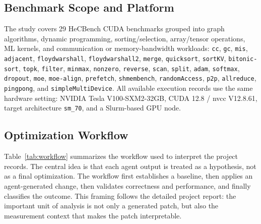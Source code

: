 \documentclass[conference]{IEEEtran}
\begin{document}
\subsection{Benchmark Scope and Platform}

The study covers 29 HeCBench CUDA benchmarks grouped into graph algorithms, dynamic programming, sorting/selection, array/tensor operations, ML kernels, and communication or memory-bandwidth workloads: \texttt{cc}, \texttt{gc}, \texttt{mis}, \texttt{adjacent}, \texttt{floydwarshall}, \texttt{floydwarshall2}, \texttt{merge}, \texttt{quicksort}, \texttt{sortKV}, \texttt{bitonic-sort}, \texttt{topk}, \texttt{filter}, \texttt{minmax}, \texttt{nonzero}, \texttt{reverse}, \texttt{scan}, \texttt{split}, \texttt{adam}, \texttt{softmax}, \texttt{dropout}, \texttt{moe}, \texttt{moe-align}, \texttt{prefetch}, \texttt{shmembench}, \texttt{randomAccess}, \texttt{p2p}, \texttt{allreduce}, \texttt{pingpong}, and \texttt{simpleMultiDevice}. All available execution records use the same hardware setting: NVIDIA Tesla V100-SXM2-32GB, CUDA 12.8 / nvcc V12.8.61, target architecture \texttt{sm\_70}, and a Slurm-based GPU node.

\subsection{Optimization Workflow}

Table~\ref{tab:workflow} summarizes the workflow used to interpret the project records. The central idea is that each agent output is treated as a hypothesis, not as a final optimization. The workflow first establishes a baseline, then applies an agent-generated change, then validates correctness and performance, and finally classifies the outcome. This framing follows the detailed project report: the important unit of analysis is not only a generated patch, but also the measurement context that makes the patch interpretable.
\end{document}
